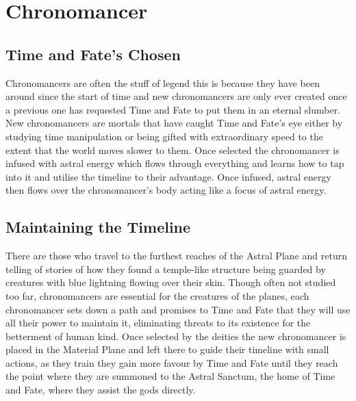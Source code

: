 
\section{Chronomancer}

\subsection{Time and Fate's Chosen}

Chronomancers are often the stuff of legend this is because they have been around since the start of time and new chronomancers are only ever created once a previous one has requested Time and Fate to put them in an eternal slumber. New chronomancers are mortals that have caught Time and Fate's eye either by studying time manipulation or being gifted with extraordinary speed to the extent that the world moves slower to them. Once selected the chronomancer is infused with astral energy which flows through everything and learns how to tap into it and utilise the timeline to their advantage. Once infused, astral energy then flows over the chronomancer's body acting like a focus of astral energy.

\subsection{Maintaining the Timeline}

There are those who travel to the furthest reaches of the Astral Plane and return telling of stories of how they found a temple-like structure being guarded by creatures with blue lightning flowing over their skin. Though often not studied too far, chronomancers are essential for the creatures of the planes, each chronomancer sets down a path and promises to Time and Fate that they will use all their power to maintain it, eliminating threats to its existence for the betterment of human kind. Once selected by the deities the new chronomancer is placed in the Material Plane and left there to guide their timeline with small actions, as they train they gain more favour by Time and Fate until they reach the point where they are summoned to the Astral Sanctum, the home of Time and Fate, where they assist the gods directly.

